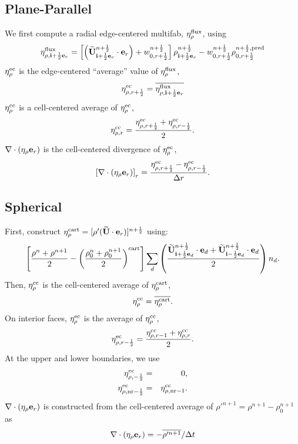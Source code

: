 \documentclass[11pt]{article}
\def\half   {\frac{1}{2}}
\def\eb         {{\bf e}}
\def\ib         {{\bf i}}
\def\Ub         {{\bf U}}
\newcommand{\Ubt}{\widetilde{\Ub}}
\def\etarho     {\eta_\rho}
\def\etarhoec   {\etarho^{\rm ec}}
\def\etarhocc   {\etarho^{\rm cc}}
\def\divetarho  {\nabla\cdot(\etarho\eb_r)}
\begin{document}
\subsection{Plane-Parallel}
We first compute a radial edge-centered multifab, $\eta_{\rho}^{\rm flux}$, using
\begin{equation}
\eta_{\rho,\ib+\half\eb_r}^{\rm flux} = \left[\left(\Ubt_{\ib+\half\eb_r}^{n+\half}\cdot\eb_r\right) + w_{0,r+\half}^{n+\half}\right] \rho_{\ib+\half\eb_r}^{n+\half} - w_{0,r+\half}^{n+\half}\rho_{0,r+\half}^{n+\half, {\rm pred}}
\end{equation}
$\etarhoec$ is the edge-centered ``average'' value of $\eta_{\rho}^{\rm flux}$,
\begin{equation}
\eta_{\rho,r+\half}^{\rm ec} = \overline{\eta_{\rho,\ib+\half\eb_r}^{\rm flux}}
\end{equation}
$\etarhocc$ is a cell-centered average of $\etarhoec$,
\begin{equation}
\eta_{\rho,r}^{\rm cc} = \frac{\eta_{\rho,r+\half}^{\rm ec} + \eta_{\rho,r-\half}^{\rm ec}}{2}.
\end{equation}
$\divetarho$ is the cell-centered divergence of $\etarhoec$,
\begin{equation}
\left[\divetarho\right]_r = \frac{\eta_{\rho,r+\half}^{\rm ec} - \eta_{\rho,r-\half}^{\rm ec}}{\Delta r}.
\end{equation}

\subsection{Spherical}
First, construct $\eta_{\rho}^{\rm cart} = [\rho'(\Ubt\cdot\eb_r)]^{n+\half}$ using:
\begin{equation}
\left[\frac{\rho^n+\rho^{n+1}}{2}-\left(\frac{\rho_0^n+\rho_0^{n+1}}{2}\right)^{\rm cart}\right] \sum_d\left(\frac{\Ubt_{\ib+\half\eb_d}^{n+\half}\cdot\eb_d+\Ubt_{\ib-\half\eb_d}^{n+\half}\cdot\eb_d}{2}\right)n_d.
\end{equation}
Then, $\etarhocc$ is the cell-centered average of $\eta_{\rho}^{\rm cart}$,
\begin{equation}
\etarhocc = \overline{\eta_{\rho}^{\rm cart}}.
\end{equation}
On interior faces, $\etarhoec$ is the average of $\etarhocc$,
\begin{equation}
\eta_{\rho,r-\half}^{\rm ec} = \frac{\eta_{\rho,r-1}^{\rm cc} + \eta_{\rho,r}^{\rm cc}}{2}.
\end{equation}
At the upper and lower boundaries, we use
\begin{eqnarray}
\eta_{\rho,-\half}^{\rm ec} &=& 0, \\
\eta_{\rho,{\rm nr}-\half}^{\rm ec} &=& \eta_{\rho,{\rm nr}-1}^{\rm cc}.
\end{eqnarray}
$\divetarho$ is constructed from the cell-centered average of $\rho'^{n+1} = \rho^{n+1} - \rho_0^{n+1}$ as
\begin{equation}
\divetarho = -\overline{\rho'^{n+1}}/\Delta t
\end{equation}
\end{document}
